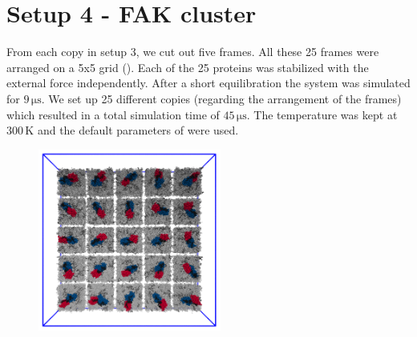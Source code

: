 \section{Setup 4 - FAK cluster}
From each copy in setup 3, we cut out five frames. All these 25 frames were arranged on a {5x5} grid (). Each of the 25 proteins was stabilized with the external force independently. After a short equilibration the system was simulated for $9\,\si{\micro\second}$. We set up 25 different copies (regarding the arrangement of the frames) which resulted in a total simulation time of $45\,\si{\micro\second}$. The temperature was kept at $300\,\si{\kelvin}$ and the default parameters of \martini{} were used.
%
%
%
\begin{figure}[h]
	\centering
	\includegraphics[height=6cm]{figures/setup/setup_cluster}
	\label{setup:setup4_pic}
\end{figure}
%
%
%